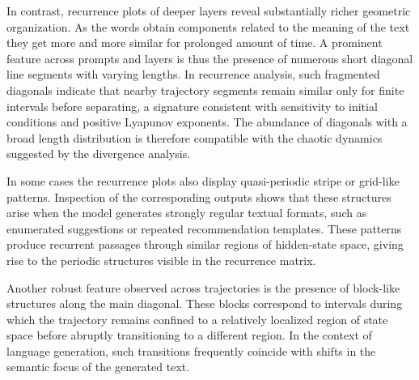\documentclass[aip%
 aip,
 amsmath,amssymb,
 reprint,%
]{revtex4-1}
\begin{document}
In contrast, recurrence plots of deeper layers reveal substantially richer geometric organization. As the words obtain components related to the meaning of the text they get more and more similar for prolonged amount of time. A prominent feature across prompts and layers is thus the presence of numerous short diagonal line segments with varying lengths. In recurrence analysis, such fragmented diagonals indicate that nearby trajectory segments remain similar only for finite intervals before separating, a signature consistent with sensitivity to initial conditions and positive Lyapunov exponents. The abundance of diagonals with a broad length distribution is therefore compatible with the chaotic dynamics suggested by the divergence analysis.

In some cases the recurrence plots also display quasi-periodic stripe or grid-like patterns. Inspection of the corresponding outputs shows that these structures arise when the model generates strongly regular textual formats, such as enumerated suggestions or repeated recommendation templates. These patterns produce recurrent passages through similar regions of hidden-state space, giving rise to the periodic structures visible in the recurrence matrix.

Another robust feature observed across trajectories is the presence of block-like structures along the main diagonal. These blocks correspond to intervals during which the trajectory remains confined to a relatively localized region of state space before abruptly transitioning to a different region. In the context of language generation, such transitions frequently coincide with shifts in the semantic focus of the generated text.


\end{document}
